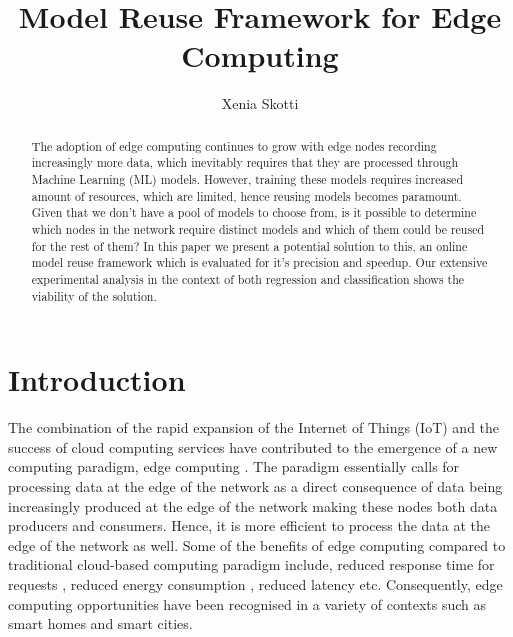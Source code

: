 \documentclass{mpaper}
\begin{document}
\title{Model Reuse Framework for Edge Computing}
\author{Xenia Skotti}

\maketitle


\begin{abstract}

The adoption of edge computing continues to grow with edge nodes recording increasingly more data, which inevitably requires that they are processed through Machine Learning (ML) models. However, training these models requires increased amount of resources, which are limited, hence reusing models becomes paramount. Given that we don't have a pool of models to choose from, is it possible to determine which nodes in the network require distinct models and which of them could be reused for the rest of them? In this paper we present a potential solution to this, an online model reuse framework which is evaluated for it's precision and speedup. Our extensive experimental analysis in the context of both regression and classification shows the viability of the solution. 

\end{abstract}

\section{Introduction}

The combination of the rapid expansion of the Internet of Things (IoT) and the success of cloud computing services have contributed to the emergence of a new computing paradigm, edge computing \cite{EdgeComputing}. The paradigm essentially calls for processing data at the edge of the network as a direct consequence of data being increasingly produced at the edge of the network making these nodes both data producers and consumers. Hence, it is more efficient to process the data at the edge of the network as well. Some of the benefits of edge computing compared to traditional cloud-based computing paradigm include, reduced response time for requests \cite{ECBreduced_response_time_wearables, ECBreduced_response_time}, reduced energy consumption \cite{ECBenergy}, reduced latency etc. Consequently, edge computing opportunities have been recognised in a variety of contexts such as smart homes and smart cities.  
\end{document}
